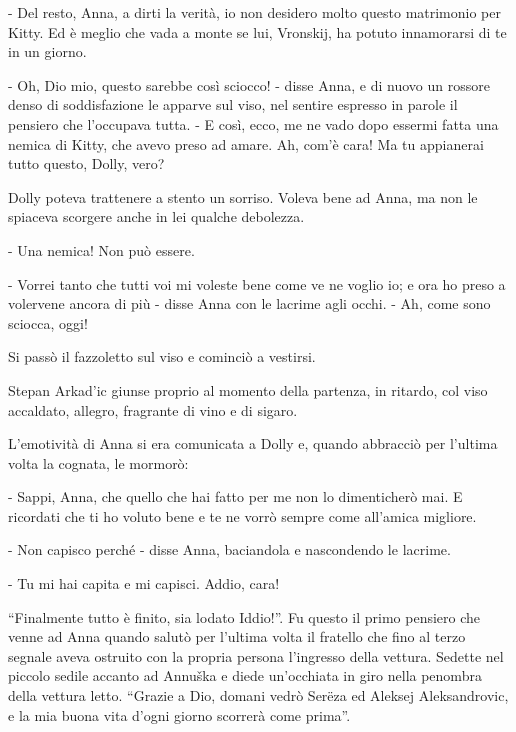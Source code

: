 - Del resto, Anna, a dirti la verità, io non desidero molto questo matrimonio per Kitty. Ed è meglio che vada a monte se lui, Vronskij, ha potuto innamorarsi di te in un giorno. 

- Oh, Dio mio, questo sarebbe così sciocco! - disse Anna, e di nuovo un rossore denso di soddisfazione le apparve sul viso, nel sentire espresso in parole il pensiero che l'occupava tutta. - E così, ecco, me ne vado dopo essermi fatta una nemica di Kitty, che avevo preso ad amare. Ah, com'è cara! Ma tu appianerai tutto questo, Dolly, vero? 

Dolly poteva trattenere a stento un sorriso. Voleva bene ad Anna, ma non le spiaceva scorgere anche in lei qualche debolezza. 

- Una nemica! Non può essere. 

- Vorrei tanto che tutti voi mi voleste bene come ve ne voglio io; e ora ho preso a volervene ancora di più - disse Anna con le lacrime agli occhi. - Ah, come sono sciocca, oggi! 

Si passò il fazzoletto sul viso e cominciò a vestirsi. 

Stepan Arkad'ic giunse proprio al momento della partenza, in ritardo, col viso accaldato, allegro, fragrante di vino e di sigaro. 

L'emotività di Anna si era comunicata a Dolly e, quando abbracciò per l'ultima volta la cognata, le mormorò: 

- Sappi, Anna, che quello che hai fatto per me non lo dimenticherò mai. E ricordati che ti ho voluto bene e te ne vorrò sempre come all'amica migliore. 

- Non capisco perché - disse Anna, baciandola e nascondendo le lacrime. 

- Tu mi hai capita e mi capisci. Addio, cara! 

``Finalmente tutto è finito, sia lodato Iddio!''. Fu questo il primo pensiero che venne ad Anna quando salutò per l'ultima volta il fratello che fino al terzo segnale aveva ostruito con la propria persona l'ingresso della vettura. Sedette nel piccolo sedile accanto ad Annuška e diede un'occhiata in giro nella penombra della vettura letto. ``Grazie a Dio, domani vedrò Serëza ed Aleksej Aleksandrovic, e la mia buona vita d'ogni giorno scorrerà come prima''. 

